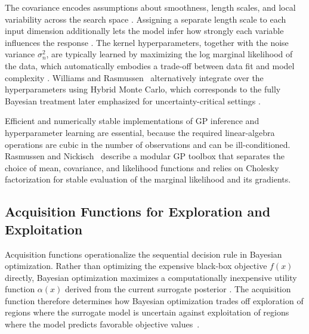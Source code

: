 \documentclass[12pt,a4paper]{report}
\begin{document}
        The covariance encodes assumptions about smoothness, length scales, and local variability across the search space \cite{williams1995gaussian,rasmussen2010gaussian}. Assigning a separate length scale to each input dimension additionally lets the model infer how strongly each variable influences the response \cite{rasmussen2010gaussian}. The kernel hyperparameters, together with the noise variance $\sigma_n^2$, are typically learned by maximizing the log marginal likelihood of the data, which automatically embodies a trade-off between data fit and model complexity \cite{rasmussen2010gaussian}. Williams and Rasmussen~\cite{williams1995gaussian} alternatively integrate over the hyperparameters using Hybrid Monte Carlo, which corresponds to the fully Bayesian treatment later emphasized for uncertainty-critical settings \cite{riis2022bayesian}.

        Efficient and numerically stable implementations of GP inference and hyperparameter learning are essential, because the required linear-algebra operations are cubic in the number of observations and can be ill-conditioned. Rasmussen and Nickisch~\cite{rasmussen2010gaussian} describe a modular GP toolbox that separates the choice of mean, covariance, and likelihood functions and relies on Cholesky factorization for stable evaluation of the marginal likelihood and its gradients.

        \subsection{Acquisition Functions for Exploration and Exploitation}
        Acquisition functions operationalize the sequential decision rule in Bayesian optimization. Rather than optimizing the expensive black-box objective $f(x)$ directly, Bayesian optimization maximizes a computationally inexpensive utility function $\alpha(x)$ derived from the current surrogate posterior \cite{snoek2012practical,balandat2019botorch}. The acquisition function therefore determines how Bayesian optimization trades off exploration of regions where the surrogate model is uncertain against exploitation of regions where the model predicts favorable objective values~\cite{shahriari2015taking}.
\end{document}
